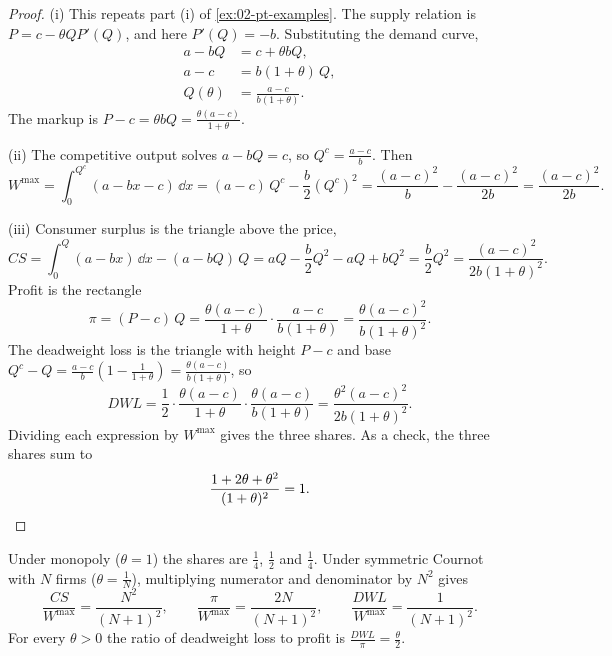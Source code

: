 \begin{proof}
(i) This repeats part (i) of \cref{ex:02-pt-examples}. The supply relation is $P = c - \theta Q P'(Q)$, and here
$P'(Q) = -b$. Substituting the demand curve,
\begin{align*}
a - bQ &= c + \theta b Q, \\
a - c &= b(1 + \theta)\, Q, \\
Q(\theta) &= \frac{a - c}{b(1 + \theta)} .
\end{align*}
The markup is $P - c = \theta b Q = \frac{\theta(a - c)}{1 + \theta}$.

(ii) The competitive output solves $a - bQ = c$, so $Q^c = \frac{a - c}{b}$. Then
\begin{equation*}
W^{\max} = \int_0^{Q^c} (a - bx - c)\,\dd x = (a - c)\,Q^c - \frac{b}{2}(Q^c)^2
= \frac{(a - c)^2}{b} - \frac{(a - c)^2}{2b} = \frac{(a - c)^2}{2b} .
\end{equation*}

(iii) Consumer surplus is the triangle above the price,
\begin{equation*}
CS = \int_0^{Q}(a - bx)\,\dd x - (a - bQ)\,Q = aQ - \frac{b}{2}Q^2 - aQ + bQ^2 = \frac{b}{2}Q^2
= \frac{(a - c)^2}{2b(1 + \theta)^2} .
\end{equation*}
Profit is the rectangle
\begin{equation*}
\pi = (P - c)\,Q = \frac{\theta(a - c)}{1 + \theta}\cdot\frac{a - c}{b(1 + \theta)} = \frac{\theta(a - c)^2}{b(1 + \theta)^2} .
\end{equation*}
The deadweight loss is the triangle with height $P - c$ and base
$Q^c - Q = \frac{a - c}{b}\left(1 - \frac{1}{1 + \theta}\right) = \frac{\theta(a - c)}{b(1 + \theta)}$, so
\begin{equation*}
\mathit{DWL} = \frac{1}{2}\cdot\frac{\theta(a - c)}{1 + \theta}\cdot\frac{\theta(a - c)}{b(1 + \theta)}
= \frac{\theta^2(a - c)^2}{2b(1 + \theta)^2} .
\end{equation*}
Dividing each expression by $W^{\max}$ gives the three shares. As a check, the three shares sum to
\[
\frac{1 + 2\theta + \theta^2}{(1 + \theta)^2} = 1 . \qedhere
\]
\end{proof}

\begin{corollary}\label{cor:02-dwl-cournot}
Under monopoly ($\theta = 1$) the shares are $\frac{1}{4}$, $\frac{1}{2}$ and $\frac{1}{4}$. Under symmetric Cournot
with $N$ firms ($\theta = \frac{1}{N}$), multiplying numerator and denominator by $N^2$ gives
\begin{equation}\label{eq:02-dwl-cournot}
\frac{CS}{W^{\max}} = \frac{N^2}{(N + 1)^2}, \qquad
\frac{\pi}{W^{\max}} = \frac{2N}{(N + 1)^2}, \qquad
\frac{\mathit{DWL}}{W^{\max}} = \frac{1}{(N + 1)^2}.
\end{equation}
For every $\theta > 0$ the ratio of deadweight loss to profit is $\frac{\mathit{DWL}}{\pi} = \frac{\theta}{2}$.
\end{corollary}

